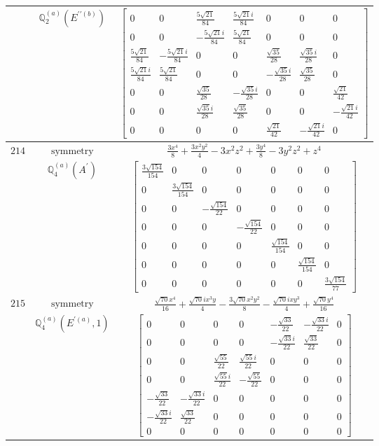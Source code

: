 \documentclass[fleqn,8pt,landscape]{jsarticle}
\begin{document}
\begin{longtable}{ccc}
$  $ & $ \mathbb{Q}_{2}^{(a)}(E^{\prime\prime(b)}) $ & $ \begin{bmatrix} 0 & 0 & \frac{5 \sqrt{21}}{84} & \frac{5 \sqrt{21} i}{84} & 0 & 0 & 0 \\ 0 & 0 & - \frac{5 \sqrt{21} i}{84} & \frac{5 \sqrt{21}}{84} & 0 & 0 & 0 \\ \frac{5 \sqrt{21}}{84} & - \frac{5 \sqrt{21} i}{84} & 0 & 0 & \frac{\sqrt{35}}{28} & \frac{\sqrt{35} i}{28} & 0 \\ \frac{5 \sqrt{21} i}{84} & \frac{5 \sqrt{21}}{84} & 0 & 0 & - \frac{\sqrt{35} i}{28} & \frac{\sqrt{35}}{28} & 0 \\ 0 & 0 & \frac{\sqrt{35}}{28} & - \frac{\sqrt{35} i}{28} & 0 & 0 & \frac{\sqrt{21}}{42} \\ 0 & 0 & \frac{\sqrt{35} i}{28} & \frac{\sqrt{35}}{28} & 0 & 0 & - \frac{\sqrt{21} i}{42} \\ 0 & 0 & 0 & 0 & \frac{\sqrt{21}}{42} & - \frac{\sqrt{21} i}{42} & 0 \end{bmatrix} $ \\ \hline
$ 214 $ & $ \text{symmetry} $ & $ \frac{3 x^{4}}{8} + \frac{3 x^{2} y^{2}}{4} - 3 x^{2} z^{2} + \frac{3 y^{4}}{8} - 3 y^{2} z^{2} + z^{4} $ \\
$  $ & $ \mathbb{Q}_{4}^{(a)}(A^{\prime}) $ & $ \begin{bmatrix} \frac{3 \sqrt{154}}{154} & 0 & 0 & 0 & 0 & 0 & 0 \\ 0 & \frac{3 \sqrt{154}}{154} & 0 & 0 & 0 & 0 & 0 \\ 0 & 0 & - \frac{\sqrt{154}}{22} & 0 & 0 & 0 & 0 \\ 0 & 0 & 0 & - \frac{\sqrt{154}}{22} & 0 & 0 & 0 \\ 0 & 0 & 0 & 0 & \frac{\sqrt{154}}{154} & 0 & 0 \\ 0 & 0 & 0 & 0 & 0 & \frac{\sqrt{154}}{154} & 0 \\ 0 & 0 & 0 & 0 & 0 & 0 & \frac{3 \sqrt{154}}{77} \end{bmatrix} $ \\ \hline
$ 215 $ & $ \text{symmetry} $ & $ \frac{\sqrt{70} x^{4}}{16} + \frac{\sqrt{70} i x^{3} y}{4} - \frac{3 \sqrt{70} x^{2} y^{2}}{8} - \frac{\sqrt{70} i x y^{3}}{4} + \frac{\sqrt{70} y^{4}}{16} $ \\
$  $ & $ \mathbb{Q}_{4}^{(a)}(E^{\prime(a)},1) $ & $ \begin{bmatrix} 0 & 0 & 0 & 0 & - \frac{\sqrt{33}}{22} & - \frac{\sqrt{33} i}{22} & 0 \\ 0 & 0 & 0 & 0 & - \frac{\sqrt{33} i}{22} & \frac{\sqrt{33}}{22} & 0 \\ 0 & 0 & \frac{\sqrt{55}}{22} & \frac{\sqrt{55} i}{22} & 0 & 0 & 0 \\ 0 & 0 & \frac{\sqrt{55} i}{22} & - \frac{\sqrt{55}}{22} & 0 & 0 & 0 \\ - \frac{\sqrt{33}}{22} & - \frac{\sqrt{33} i}{22} & 0 & 0 & 0 & 0 & 0 \\ - \frac{\sqrt{33} i}{22} & \frac{\sqrt{33}}{22} & 0 & 0 & 0 & 0 & 0 \\ 0 & 0 & 0 & 0 & 0 & 0 & 0 \end{bmatrix} $ \\ \hline

\end{longtable}
\end{document}
